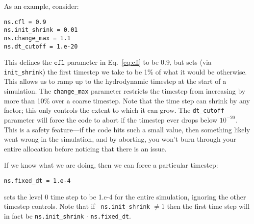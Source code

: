 As an example, consider:
\begin{lstlisting}
ns.cfl = 0.9 
ns.init_shrink = 0.01 
ns.change_max = 1.1
ns.dt_cutoff = 1.e-20
\end{lstlisting}
This defines the $\mathtt{cfl}$ parameter in Eq.~\ref{eq:cfl} to be 0.9,
but sets (via {\tt init\_shrink}) the first timestep we take
to be 1\% of what it would be otherwise.  This allows us to
ramp up to the hydrodynamic timestep at the start of a simulation.
The {\tt change\_max} parameter restricts the timestep from increasing
by more than 10\% over a coarse timestep.    Note that the time step
can shrink by any factor; this only controls the extent to which it can grow.
The {\tt dt\_cutoff} parameter will force the code to abort if the
timestep ever drops below $10^{-20}$.  This is a safety feature---if the
code hits such a small value, then something likely went wrong in the
simulation, and by aborting, you won't burn through your entire allocation
before noticing that there is an issue.

If we know what we are doing, then we can force a particular timestep:
\begin{lstlisting}
ns.fixed_dt = 1.e-4
\end{lstlisting}
sets the level 0 time step to be 1.e-4 for the entire simulation,
ignoring the other timestep controls.  Note that if {\tt
ns.init\_shrink} $\neq 1$ then the first time step will in fact be
{\tt ns.init\_shrink} $\cdot$ {\tt ns.fixed\_dt}.




